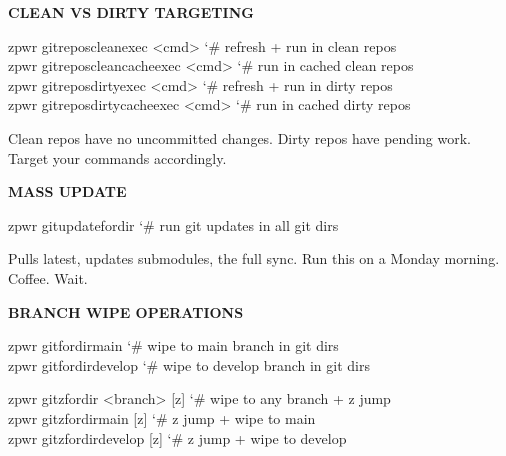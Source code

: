 \documentclass[11pt,a4paper,twoside]{book}
\begin{document}
\vspace{12pt}
{\bfseries\color{neonyellow} CLEAN VS DIRTY TARGETING}\vspace{4pt}

\begin{codebox}
\color{neongreen}zpwr gitreposcleanexec <cmd>       {\char`\#} refresh + run in clean repos\\
\color{neongreen}zpwr gitreposcleancacheexec <cmd>  {\char`\#} run in cached clean repos\\
\color{neongreen}zpwr gitreposdirtyexec <cmd>       {\char`\#} refresh + run in dirty repos\\
\color{neongreen}zpwr gitreposdirtycacheexec <cmd>  {\char`\#} run in cached dirty repos\\
\end{codebox}

Clean repos have no uncommitted changes. Dirty repos have pending work. Target your commands accordingly.


\vspace{12pt}
{\bfseries\color{neonyellow} MASS UPDATE}\vspace{4pt}

\begin{codebox}
\color{neongreen}zpwr gitupdatefordir      {\char`\#} run git updates in all git dirs\\
\end{codebox}

Pulls latest, updates submodules, the full sync. Run this on a Monday morning. Coffee. Wait.


\vspace{12pt}
{\bfseries\color{neonyellow} BRANCH WIPE OPERATIONS}\vspace{4pt}

\begin{codebox}
\color{neongreen}zpwr gitfordirmain        {\char`\#} wipe to main branch in git dirs\\
\color{neongreen}zpwr gitfordirdevelop     {\char`\#} wipe to develop branch in git dirs\\
\end{codebox}

\begin{codebox}
\color{neongreen}zpwr gitzfordir <branch> [z]       {\char`\#} wipe to any branch + z jump\\
\color{neongreen}zpwr gitzfordirmain [z]            {\char`\#} z jump + wipe to main\\
\color{neongreen}zpwr gitzfordirdevelop [z]         {\char`\#} z jump + wipe to develop\\
\end{codebox}
\end{document}
